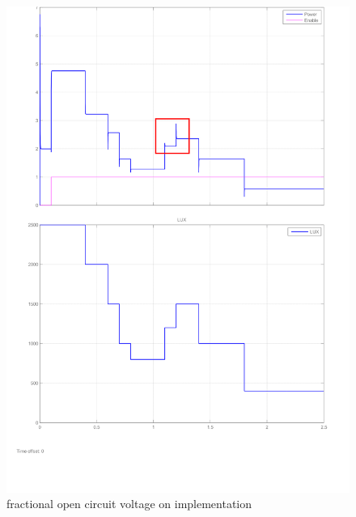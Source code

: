  \begin{figure}[H]
  \begin{center}
  \includegraphics[width=\textwidth]{images/proposed_step_input}
  \caption{ fractional open circuit voltage on implementation}
  \label{fig:Frac_oc_result}
  \end{center}
  \end{figure}


  



